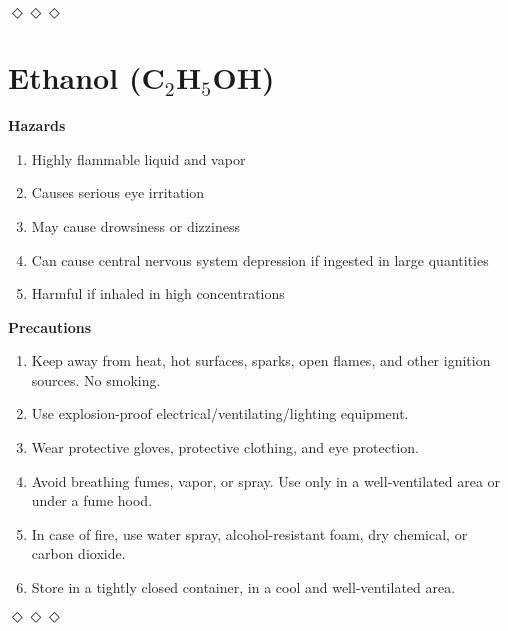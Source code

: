 \documentclass{report}
\begin{document}
\bigskip
\centerline{$\Diamond\Diamond\Diamond$} %
\bigskip

\section*{Ethanol (C$_2$H$_5$OH)}{
	\textbf{Hazards}
	\begin{enumerate}
		\item Highly flammable liquid and vapor
		\item Causes serious eye irritation
		\item May cause drowsiness or dizziness
		\item Can cause central nervous system depression if ingested in large quantities
		\item Harmful if inhaled in high concentrations
	\end{enumerate}
	\textbf{Precautions}
	\begin{enumerate}
		\item Keep away from heat, hot surfaces, sparks, open flames, and other ignition sources. No smoking.
		\item Use explosion-proof electrical/ventilating/lighting equipment.
		\item Wear protective gloves, protective clothing, and eye protection.
		\item Avoid breathing fumes, vapor, or spray. Use only in a well-ventilated area or under a fume hood.
		\item In case of fire, use water spray, alcohol-resistant foam, dry chemical, or carbon dioxide.
		\item Store in a tightly closed container, in a cool and well-ventilated area.
	\end{enumerate}
}

\bigskip
\centerline{$\Diamond\Diamond\Diamond$} %
\bigskip
\end{document}
